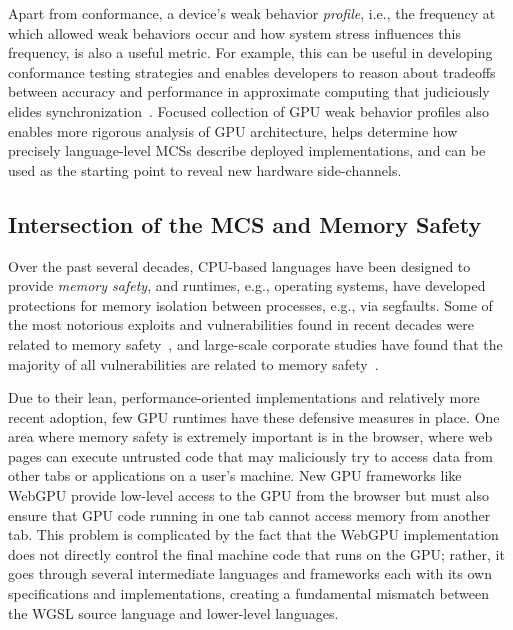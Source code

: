 Apart from conformance, a device's weak behavior \textit{profile}, i.e., the frequency at which allowed weak behaviors occur and how system stress influences this frequency, is also a useful metric. For example, this can be useful in developing conformance testing strategies and enables developers to reason about tradeoffs between accuracy and performance in approximate computing that judiciously elides synchronization~\cite{niu2011hogwild,renganarayana2012programming,samadi2013sage}. Focused collection of GPU weak behavior profiles also enables more rigorous analysis of GPU architecture, helps determine how precisely language-level MCSs describe deployed implementations, and can be used as the starting point to reveal new hardware side-channels.

\subsection{Intersection of the MCS and Memory Safety}

Over the past several decades, CPU-based languages have been designed to provide \textit{memory safety}, and runtimes, e.g., operating systems, have developed protections for memory isolation between processes, e.g., via segfaults. Some of the most notorious exploits and vulnerabilities found in recent decades were related to memory safety~\cite{heartbleed,trident,slammer-worm}, and large-scale corporate studies have found that the majority of all vulnerabilities are related to memory safety~\cite{microsoft2019safer,google2019queue}.

Due to their lean, performance-oriented implementations and relatively more recent adoption, few GPU runtimes have these defensive measures in place. One area where memory safety is extremely important is in the browser, where web pages can execute untrusted code that may maliciously try to access data from other tabs or applications on a user's machine. New GPU frameworks like WebGPU provide low-level access to the GPU from the browser but must also ensure that GPU code running in one tab cannot access memory from another tab. This problem is complicated by the fact that the WebGPU implementation does not directly control the final machine code that runs on the GPU; rather, it goes through several intermediate languages and frameworks each with its own specifications and implementations, creating a fundamental mismatch between the WGSL source language and lower-level languages.

